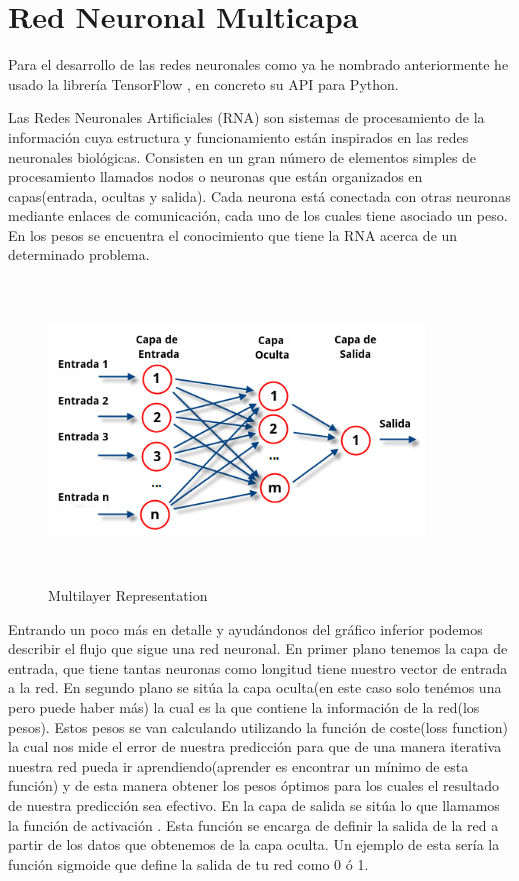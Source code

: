 \documentclass{article}
\begin{document}
\section{Red Neuronal Multicapa}

Para el desarrollo de las redes neuronales como ya he nombrado anteriormente he usado la librería TensorFlow \cite{tensorflow2015-whitepaper}, en concreto su API para Python.

Las Redes Neuronales Artificiales (RNA) \cite{RNA} son sistemas de procesamiento de la información cuya estructura y funcionamiento están inspirados en las redes neuronales biológicas. Consisten en un gran número de elementos simples de procesamiento llamados nodos o neuronas que están organizados en capas(entrada, ocultas y salida). Cada neurona está conectada con otras neuronas mediante enlaces de comunicación, cada uno de los cuales tiene asociado un peso. En los pesos se encuentra el conocimiento que tiene la RNA acerca de un determinado problema.

\begin{figure}[H]
  \centering
  \includegraphics[width=100mm, height=80mm]{images/multilayer_nn.png}
  \caption{Multilayer Representation}
\end{figure}


Entrando un poco más en detalle y ayudándonos del gráfico inferior podemos describir el flujo que sigue una red neuronal. En primer plano tenemos la capa de entrada, que tiene tantas neuronas como longitud tiene nuestro vector de entrada a la red. En segundo plano se sitúa la capa oculta(en este caso solo tenémos una pero puede haber más) la cual es la que contiene la información de la red(los pesos). Estos pesos se van calculando utilizando la función de coste(loss function) \cite{loss_function} la cual nos mide el error de nuestra predicción para que de una manera iterativa nuestra red pueda ir aprendiendo(aprender es encontrar un mínimo de esta función) y de esta manera obtener los pesos óptimos para los cuales el resultado de nuestra predicción sea efectivo.
En la capa de salida se sitúa lo que llamamos la función de activación \cite{activation_function}. Esta función se encarga de definir la salida de la red a partir de los datos que obtenemos de la capa oculta. Un ejemplo de esta sería la función sigmoide \cite{sigmoid} que define la salida de tu red como 0 ó 1.
\end{document}
